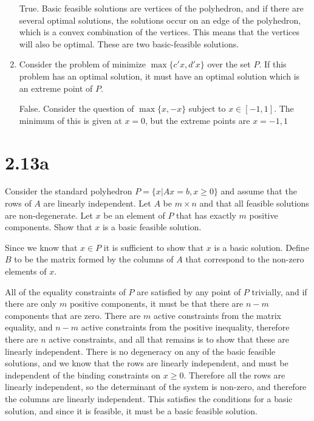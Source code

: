 \documentclass[12pt]{paper}
\begin{document}
\begin{enumerate}
  True. Basic feasible solutions are vertices of the polyhedron, and
  if there are several optimal solutions, the solutions occur on an
  edge of the polyhedron, which is a convex combination of the
  vertices. This means that the vertices will also be optimal. These
  are two basic-feasible solutions.
\item Consider the problem of minimize $\max \{c'x, d'x\}$ over the
  set $P$. If this problem has an optimal solution, it must have an
  optimal solution which is an extreme point of $P$.

  False. Consider the question of  $\max\{x,-x\}$ subject to $x \in
  [-1,1]$. The minimum of this is given at $x=0$, but the extreme
  points are $x = -1,1$
\end{enumerate}

\section{2.13a}

Consider the standard polyhedron $P = \{ x \vert Ax = b, x \geq 0 \}$ and assume
that the rows of $A$ are linearly independent. Let $A$ be $m \times n$ and
that all feasible solutions are non-degenerate. Let $x$ be an element
of $P$ that has exactly $m$ positive components. Show that $x$ is a
basic feasible solution.

\vspace{.3in}

Since we know that $x\in P$ it is sufficient to show that $x$ is a basic
solution. Define $B$ to be the matrix formed by the columns of $A$
that correspond to the non-zero elements of $x$.

All of the equality constraints of $P$ are satisfied by any point of
$P$ trivially, and if there are only $m$ positive components, it must
be that there are $n-m$ components that are zero. There are $m$ active
constraints from the matrix equality, and $n-m$ active constraints
from the positive inequality, therefore there are $n$ active
constraints, and all that remains is to show that these are linearly
independent. There is no degeneracy on any of the basic feasible
solutions, and we know that the rows are linearly independent, and
must be independent of the binding constraints on $x \geq 0$. Therefore
all the rows are linearly independent, so the determinant of the
system is non-zero, and therefore the columns are linearly
independent. This satisfies the conditions for a basic solution, and
since it is feasible, it must be a basic feasible solution.
\end{document}
